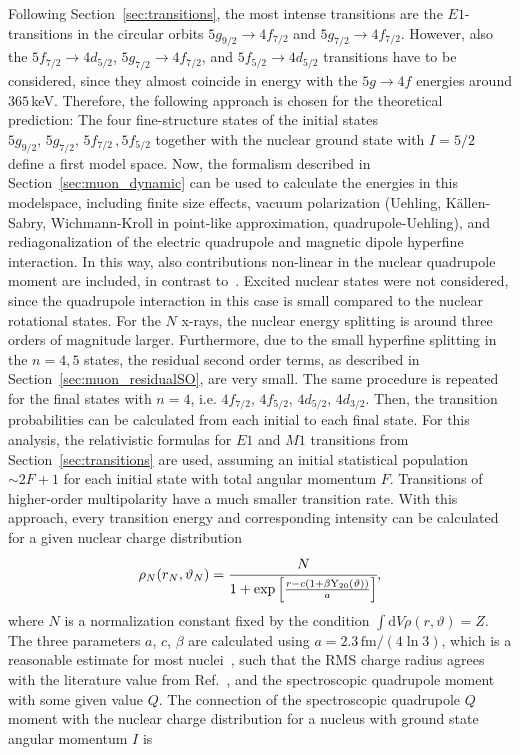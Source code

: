 Following Section~\ref{sec:transitions}, the most intense transitions are the $E1$-transitions in the circular orbits $5g_{9/2}\rightarrow4f_{7/2}$ and $5g_{7/2}\rightarrow4f_{7/2}$. However, also the $5f_{7/2}\rightarrow4d_{5/2}$, $5g_{7/2}\rightarrow 4f_{7/2}$, and $5f_{5/2}\rightarrow 4d_{5/2}$ transitions have to be considered, since they almost coincide in energy with the $5g\rightarrow4f$ energies around $365\,$keV. Therefore, the following approach is chosen for the theoretical prediction: The four fine-structure states of the initial states $5g_{9/2},\,5g_{7/2},\,5f_{7/2}\,,5f_{5/2}$ together with the nuclear ground state with $I=5/2$ define a first model space. Now, the formalism described in Section~\ref{sec:muon_dynamic} can be used to calculate the energies in this modelspace, including finite size effects, vacuum polarization (Uehling, Källen-Sabry, Wichmann-Kroll in point-like approximation, quadrupole-Uehling), and rediagonalization of the electric quadrupole and magnetic dipole hyperfine interaction. In this way, also contributions non-linear in the nuclear quadrupole moment are included, in contrast to~\cite{konijn1979}.
Excited nuclear states were not considered, since the quadrupole interaction in this case is small compared to the nuclear rotational states. For the $N$ x-rays, the nuclear energy splitting is around three orders of magnitude larger. Furthermore, due to the small hyperfine splitting in the ${n}{=}{4,5}$ states, the residual second order terms, as described in Section~\ref{sec:muon_residualSO}, are very small.
The same procedure is repeated for the final states with ${n}{=}{4}$, i.e. $4f_{7/2},\,4f_{5/2},\,4d_{5/2},\,4d_{3/2}$.
Then, the transition probabilities can be calculated from each initial to each final state. For this analysis, the relativistic formulas for $E1$ and $M1$ transitions from Section~\ref{sec:transitions} are used, assuming an initial statistical population $\sim 2F+1$ for each initial state with total angular momentum $F$. Transitions of higher-order multipolarity have a much smaller transition rate. With this approach, every transition energy and corresponding intensity can be calculated for a given nuclear charge distribution
\begin{equation}
\rho_N(r_N,\vartheta_N)=\cfrac{N}{1+\exp\left[\frac{r-c(1+\beta \text{Y}_{20}(\vartheta))}{a}\right]},
\end{equation}
where $N$ is a normalization constant fixed by the condition $\int\text{d}V \rho(r,\vartheta) = Z$.
The three parameters $a$, $c$, $\beta$ are calculated using $a=2.3\,\text{fm}/(4\ln3)$, which is a reasonable estimate for most nuclei~\cite{Beier2000}, such that the RMS charge radius agrees with the literature value from Ref.~\cite{Angeli2013}, and the spectroscopic quadrupole moment with some given value $Q$. The connection of the spectroscopic quadrupole $Q$ moment with the nuclear charge distribution for a nucleus with ground state angular momentum $I$ is
